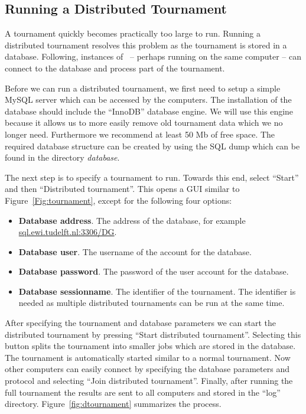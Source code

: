 \documentclass[]{article}
\begin{document}
\subsection{Running a Distributed Tournament}
A tournament quickly becomes practically too large to run. Running a distributed tournament resolves this problem as the tournament is stored in a database. Following, instances of \Genius~-- perhaps running on the same computer -- can connect to the database and process part of the tournament.

Before we can run a distributed tournament, we first need to setup a simple MySQL server which can be accessed by the computers. The installation of the database should include the ``InnoDB'' database engine. We will use this engine because it allows us to more easily remove old tournament data which we no longer need. Furthermore we recommend at least 50 Mb of free space. The required database structure can be created by using the SQL dump which can be found in the directory \textit{database}.

The next step is to specify a tournament to run. Towards this end, select ``Start'' and then ``Distributed tournament''. This opens a GUI similar to Figure~\ref{Fig:tournament}, except for the following four options:

\begin{itemize}
	\item \textbf{Database address}. The address of the database, for example \url{sql.ewi.tudelft.nl:3306/DG}.
	\item \textbf{Database user}. The username of the account for the database.
	\item \textbf{Database password}. The password of the user account for the database.
	\item \textbf{Database sessionname}. The identifier of the tournament. The identifier is needed as multiple distributed tournaments can be run at the same time.
\end{itemize}

After specifying the tournament and database parameters we can start the distributed tournament by pressing ``Start distributed tournament''. Selecting this button splits the tournament into smaller jobs which are stored in the database. The tournament is automatically started similar to a normal tournament. Now other computers can easily connect by specifying the database parameters and protocol and selecting ``Join distributed tournament''. Finally, after running the full tournament the results are sent to all computers and stored in the ``log'' directory. Figure~\ref{fig:dtournament} summarizes the process.
\end{document}
